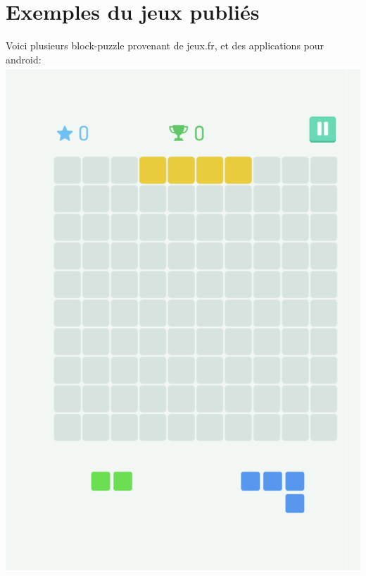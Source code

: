 \documentclass[]{report}
\begin{document}
\section{Exemples du jeux publiés}
Voici plusieurs block-puzzle provenant de jeux.fr, et des applications pour android: \\
\includegraphics[scale=0.3]{images/jeuxPublie1.png}
\end{document}
